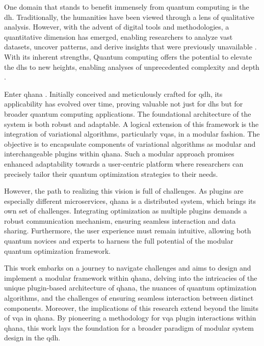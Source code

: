 \documentclass[
  a4paper,  %
  twoside,  %
  bibliography=totoc,
  headsepline,
  cleardoublepage=empty,
  parskip=half,
  draft=false
]{scrbook}
\begin{document}
One domain that stands to benefit immensely from quantum computing is the \gls{dh}.
Traditionally, the humanities have been viewed through a lens of qualitative analysis.
However, with the advent of digital tools and methodologies, a quantitative dimension has emerged, enabling researchers to analyze vast datasets, uncover patterns, and derive insights that were previously unavailable \cite{Barzen2019}.
With its inherent strengths, Quantum computing offers the potential to elevate the \glspl{dh} to new heights, enabling analyses of unprecedented complexity and depth \cite{Barzen2022}.

Enter \gls{qhana} \cite{Buehler2022}.
Initially conceived and meticulously crafted for \gls{qdh}, its applicability has evolved over time, proving valuable not just for \glspl{dh} but for broader quantum computing applications.
The foundational architecture of the system is both robust and adaptable.
A logical extension of this framework is the integration of variational algorithms, particularly \glspl{vqa}, in a modular fashion.
The objective is to encapsulate components of variational algorithms as modular and interchangeable plugins within \gls{qhana}.
Such a modular approach promises enhanced adaptability towards a user-centric platform where researchers can precisely tailor their quantum optimization strategies to their needs.

However, the path to realizing this vision is full of challenges.
As plugins are especially different microservices, \gls{qhana} is a distributed system, which brings its own set of challenges.
Integrating optimization as multiple plugins demands a robust communication mechanism, ensuring seamless interaction and data sharing.
Furthermore, the user experience must remain intuitive, allowing both quantum novices and experts to harness the full potential of the modular quantum optimization framework.

This work embarks on a journey to navigate challenges and aims to design and implement a modular framework within \gls{qhana}, delving into the intricacies of the unique plugin-based architecture of \gls{qhana}, the nuances of quantum optimization algorithms, and the challenges of ensuring seamless interaction between distinct components.
Moreover, the implications of this research extend beyond the limits of \gls{vqa} in \gls{qhana}.
By pioneering a methodology for \gls{vqa} plugin interactions within \gls{qhana}, this work lays the foundation for a broader paradigm of modular system design in the \gls{qdh}.
\end{document}
